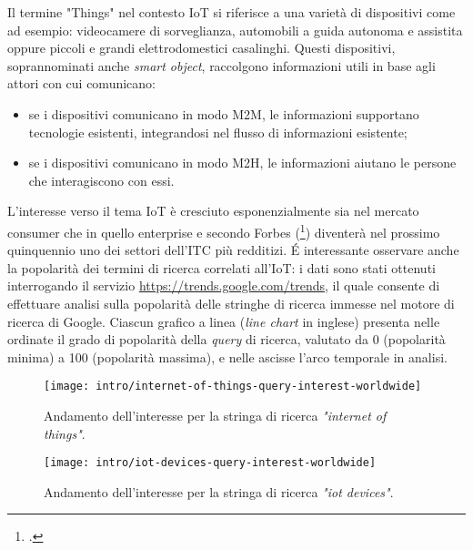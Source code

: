 Il termine "Things" nel contesto IoT si riferisce a una varietà di dispositivi come ad esempio: videocamere di sorveglianza, automobili a guida autonoma e assistita oppure piccoli e grandi elettrodomestici casalinghi. Questi dispositivi, soprannominati anche \textit{smart object}, raccolgono informazioni utili in base agli attori con cui comunicano:
\begin{itemize}
  \item se i dispositivi comunicano in modo M2M, le informazioni supportano tecnologie esistenti, integrandosi nel flusso di informazioni esistente;
  \item se i dispositivi comunicano in modo M2H, le informazioni aiutano le persone che interagiscono con essi.
\end{itemize}

L'interesse verso il tema IoT è cresciuto esponenzialmente sia nel mercato consumer che in quello enterprise e secondo Forbes (\footcite{site:forbes-iot}) diventerà nel prossimo quinquennio uno dei settori dell'ITC più redditizi.
É interessante osservare anche la popolarità dei termini di ricerca correlati all'IoT: i dati sono stati ottenuti interrogando il servizio \url{https://trends.google.com/trends}, il quale consente di effettuare analisi sulla popolarità delle stringhe di ricerca immesse nel motore di ricerca di Google.
Ciascun grafico a linea (\textit{line chart} in inglese) presenta nelle ordinate il grado di popolarità della \textit{query} di ricerca, valutato da 0 (popolarità minima) a 100 (popolarità massima), e nelle ascisse l'arco temporale in analisi.

\begin{figure}[H]
    \centering
    \texttt{[image: intro/internet-of-things-query-interest-worldwide]}
    \caption{Andamento dell'interesse per la stringa di ricerca \textit{"internet of things"}. \\ \cite{site:iot-long-trend}}
    \label{fig:internet-of-things-query-interest}
\end{figure}

\begin{figure}[H]
    \centering
    \texttt{[image: intro/iot-devices-query-interest-worldwide]}
    \caption{Andamento dell'interesse per la stringa di ricerca \textit{"iot devices"}. \\ \cite{site:iot-devices-trend}}
    \label{fig:iot-devices-query-interest}
\end{figure}

